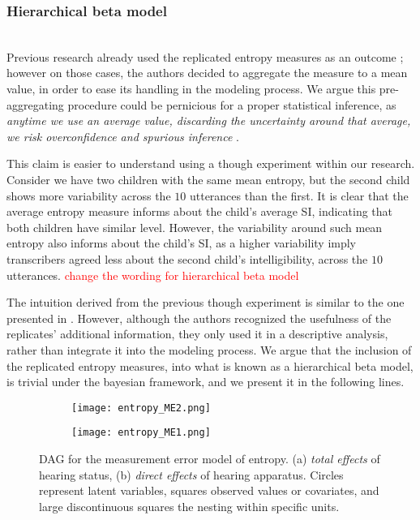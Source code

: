 \subsubsection{Hierarchical beta model} \\
%
Previous research already used the replicated entropy measures as an outcome \citep{Boonen_et_al_2021, Faes_et_al_2021}; however on those cases, the authors decided to aggregate the measure to a mean value, in order to ease its handling in the modeling process. We argue this pre-aggregating procedure could be pernicious for a proper statistical inference, as \textit{anytime we use an average value, discarding the uncertainty around that average, we risk overconfidence and spurious inference} \citep{McElreath_2020}. 

This claim is easier to understand using a though experiment within our research.  Consider we have two children with the same mean entropy, but the second child shows more variability across the $10$ utterances than the first. It is clear that the average entropy measure informs about the child's average SI, indicating that both children have similar level. However, the variability around such mean entropy also informs about the child's SI, as a higher variability imply transcribers agreed less about the second child's intelligibility, across the $10$ utterances. \textcolor{red}{change the wording for hierarchical beta model}

The intuition derived from the previous though experiment is similar to the one presented in \citet{Boonen_et_al_2021}. However, although the authors recognized the usefulness of the replicates' additional information, they only used it in a descriptive analysis, rather than integrate it into the modeling process. We argue that the inclusion of the replicated entropy measures, into what is known as a hierarchical beta model, is trivial under the bayesian framework, and we present it in the following lines.
%
\begin{figure}[h]
	\centering
	\begin{subfigure}{0.435\textwidth}
		\centering
		\texttt{[image: entropy\_ME2.png]}
		\caption{}
	\end{subfigure}
	\hfill
	\begin{subfigure}{0.5\textwidth}
		\centering
		\texttt{[image: entropy\_ME1.png]}
		\caption{}
	\end{subfigure}
	\caption[DAG for the measurement error model of entropy.]%
	{DAG for the measurement error model of entropy. (a) \textit{total effects} of hearing status, (b) \textit{direct effects} of hearing apparatus. Circles represent latent variables, squares observed values or covariates, and large discontinuous squares the nesting within specific units.}
	\label{fig:entropy_ME}
\end{figure}
%


